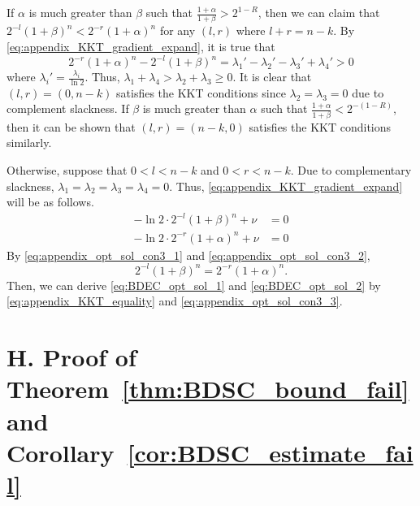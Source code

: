 \documentclass[10pt,twocolumn,twoside,submit]{JCNtran}
\begin{document}
	If $\alpha$ is much greater than $\beta$ such that $\frac{1+\alpha}{1+\beta} > 2^{1 - R} $, then we can claim that $2^{-l} \left(1 + \beta \right)^n < 2^{-r} \left(1 + \alpha \right)^n$ for any $(l, r)$ where $l+r = n-k$. By \eqref{eq:appendix_KKT_gradient_expand}, it is true that  
	\begin{equation}
		2^{-r} \left(1 + \alpha \right)^n - 2^{-l} \left(1 + \beta \right)^n = \lambda_1' - \lambda_2' - \lambda_3' + \lambda_4' > 0
	\end{equation}
	where $\lambda_i' = \frac{\lambda_i}{\ln{2}}$. Thus, $\lambda_1 + \lambda_4 > \lambda_2 + \lambda_3 \ge 0$. It is clear that $(l, r) = (0, n-k)$ satisfies the KKT conditions since $\lambda_2 = \lambda_3 = 0$ due to complement slackness. If $\beta$ is much greater than $\alpha$ such that $\frac{1+\alpha}{1+\beta} < 2^{-(1 - R)}$, then it can be shown that $(l, r) = (n-k, 0)$ satisfies the KKT conditions similarly. 
	
	Otherwise, suppose that $0<l<n-k$ and $0 < r < n-k$. Due to complementary slackness, $\lambda_1 = \lambda_2 = \lambda_3 = \lambda_4 = 0$. Thus, \eqref{eq:appendix_KKT_gradient_expand} will be as follows.
	\begin{align}
		- \ln{2} \cdot 2^{-l} \left( 1 + \beta \right)^n + \nu &= 0 \label{eq:appendix_opt_sol_con3_1}\\
		- \ln{2} \cdot 2^{-r} \left( 1 + \alpha \right)^n + \nu &= 0 \label{eq:appendix_opt_sol_con3_2}
	\end{align}
	By \eqref{eq:appendix_opt_sol_con3_1} and \eqref{eq:appendix_opt_sol_con3_2},
	\begin{equation} \label{eq:appendix_opt_sol_con3_3}
		2^{-l} \left( 1 + \beta \right)^n = 2^{-r} \left( 1 + \alpha \right)^n.
	\end{equation}
	Then, we can derive \eqref{eq:BDEC_opt_sol_1} and \eqref{eq:BDEC_opt_sol_2} by \eqref{eq:appendix_KKT_equality} and \eqref{eq:appendix_opt_sol_con3_3}. 		
\section*{H. Proof of Theorem~\ref{thm:BDSC_bound_fail} and Corollary~\ref{cor:BDSC_estimate_fail}\label{pf:BDSC_bound_fail}}
\end{document}
